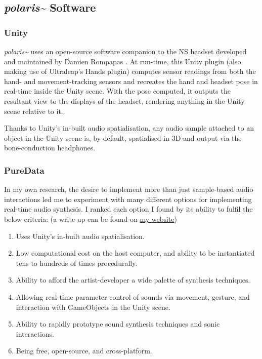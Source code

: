 \subsection{\textit{polaris\textasciitilde{}} Software}\label{sec: polaris-framework-software}
\subsubsection{Unity}\label{sec: polaris-framework-software-unity}
\textit{polaris\textasciitilde{}} uses an open-source software companion to the NS headset developed and maintained by Damien Rompapas \citeyearpar{rompapas2020}. At run-time, this Unity plugin (also making use of Ultraleap’s Hands plugin) computes sensor readings from both the hand- and movement-tracking sensors and recreates the hand and headset pose in real-time inside the Unity scene. With the pose computed, it outputs the resultant view to the displays of the headset, rendering anything in the Unity scene relative to it.

Thanks to Unity’s in-built audio spatialisation, any audio sample attached to an object in the Unity scene is, by default, spatialised in 3D and output via the bone-conduction headphones.

\subsubsection{PureData}\label{sec: polaris-framework-software-puredata}
In my own research, the desire to implement more than just sample-based audio interactions led me to experiment with many different options for implementing real-time audio synthesis. I ranked each option I found by its ability to fulfil the below criteria: (a write-up can be found on \href{https://sambilbow.com/projects/polaris/software.html}{my website})

\begin{enumerate}
    \item Uses Unity’s in-built audio spatialisation.
    \item Low computational cost on the host computer, and ability to be instantiated tens to hundreds of times procedurally.
    \item Ability to afford the artist-developer a wide palette of synthesis techniques.
    \item Allowing real-time parameter control of sounds via movement, gesture, and interaction with GameObjects in the Unity scene.
    \item Ability to rapidly prototype sound synthesis techniques and sonic interactions.
    \item Being free, open-source, and cross-platform.
\end{enumerate}

